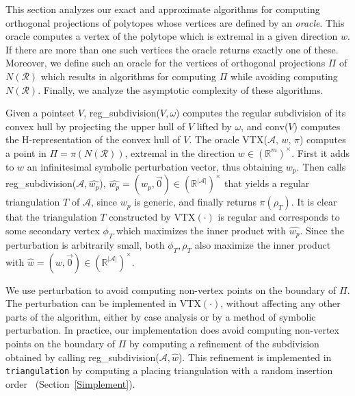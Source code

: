 \documentclass{article}
\def\RR{{\mathbb R}} \def\ZZ{{\mathbb Z}}
\def\A{{\mathcal A}} \def\R{{\mathcal R}}
\begin{document}
This section analyzes our exact and approximate algorithms for computing
orthogonal projections of polytopes whose vertices are defined by an
\emph{oracle}.
This oracle computes a 
vertex of the polytope which is extremal in a given
direction $w$. If there are more than one such vertices 
the oracle returns exactly one of these. Moreover, we define such an oracle for the
vertices of orthogonal projections $\varPi$ of $N(\R)$ which results in algorithms for
computing $\varPi$ while avoiding computing $N(\R)$. 
Finally, we analyze the
asymptotic complexity of these algorithms.

Given a pointset $V$, {reg\_subdivision($V, \omega$)} 
computes the regular subdivision of its convex hull by projecting 
the upper hull of $V$ lifted by $\omega$, and
{conv($V$)} computes the H-representation of the convex hull of $V$.
The oracle {VTX}($\A,\,w,\,\pi$) 
computes a point in $\varPi=\pi(N(\R))$, extremal
in the direction $w\in(\RR^m)^\times$. 
First it adds to $w$ an infinitesimal symbolic
perturbation vector, thus obtaining $w_p$. 
Then calls reg\_subdivision($\A,
\widehat{w_p}$), $\widehat{w_p}=(w_p,\vec{0})\in (\RR^{|\A|})^\times$ that yields 
a regular triangulation $T$ of $\A$, since $w_p$ is generic,
and finally returns $\pi(\rho_T)$. 
It is clear that the 
triangulation $T$ constructed by {VTX}$(\cdot)$ is regular and
corresponds to some secondary vertex $\phi_T$ which maximizes the
inner product with $\widehat{w_p}$. 
Since the perturbation is arbitrarily small, both $\phi_T, \rho_T$ also maximize the
inner product with $\widehat{w}=(w,\vec{0})\in (\RR^{|\A|})^\times$.

We use perturbation to avoid computing non-vertex points on the boundary of $\varPi$.
The perturbation can be implemented in VTX$(\cdot)$, without
affecting any other parts of the algorithm, either by case analysis or by
a method of symbolic perturbation.
In practice, our implementation does avoid computing non-vertex points on 
the boundary of $\varPi$ by 
computing a refinement of the subdivision obtained by calling 
reg\_subdivision($\A, \widehat{w}$). 
This refinement is implemented in {\tt triangulation} 
by computing a placing triangulation 
with a random insertion order~ (Section~\ref{Simplement}).
\end{document}
